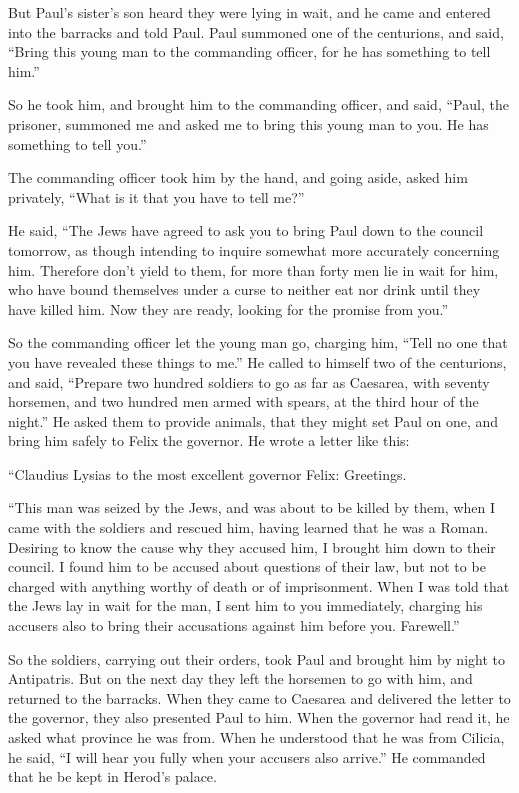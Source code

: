 {\par }{\PP {}But Paul’s sister’s son heard they were lying in wait, and he came and entered into the barracks and told Paul.
Paul summoned one of the centurions, and said, “Bring this young man to the commanding officer, for he has something to tell him.”
\par }{\PP {}So he took him, and brought him to the commanding officer, and said, “Paul, the prisoner, summoned me and asked me to bring this young man to you. He has something to tell you.”
\par }{\PP {}The commanding officer took him by the hand, and going aside, asked him privately, “What is it that you have to tell me?”
\par }{\PP {}He said, “The Jews have agreed to ask you to bring Paul down to the council tomorrow, as though intending to inquire somewhat more accurately concerning him.
Therefore don’t yield to them, for more than forty men lie in wait for him, who have bound themselves under a curse to neither eat nor drink until they have killed him. Now they are ready, looking for the promise from you.”
\par }{\PP {}So the commanding officer let the young man go, charging him, “Tell no one that you have revealed these things to me.”
He called to himself two of the centurions, and said, “Prepare two hundred soldiers to go as far as Caesarea, with seventy horsemen, and two hundred men armed with spears, at the third hour of the night.”
He asked them to provide animals, that they might set Paul on one, and bring him safely to Felix the governor.
He wrote a letter like this:
\par }{\PP {}“Claudius Lysias to the most excellent governor Felix: Greetings.
\par }{\PP {}“This man was seized by the Jews, and was about to be killed by them, when I came with the soldiers and rescued him, having learned that he was a Roman.
Desiring to know the cause why they accused him, I brought him down to their council.
I found him to be accused about questions of their law, but not to be charged with anything worthy of death or of imprisonment.
When I was told that the Jews lay in wait for the man, I sent him to you immediately, charging his accusers also to bring their accusations against him before you. Farewell.”
\par }{\PP {}So the soldiers, carrying out their orders, took Paul and brought him by night to Antipatris.
But on the next day they left the horsemen to go with him, and returned to the barracks.
When they came to Caesarea and delivered the letter to the governor, they also presented Paul to him.
When the governor had read it, he asked what province he was from. When he understood that he was from Cilicia, he said,
“I will hear you fully when your accusers also arrive.” He commanded that he be kept in Herod’s palace.

}
